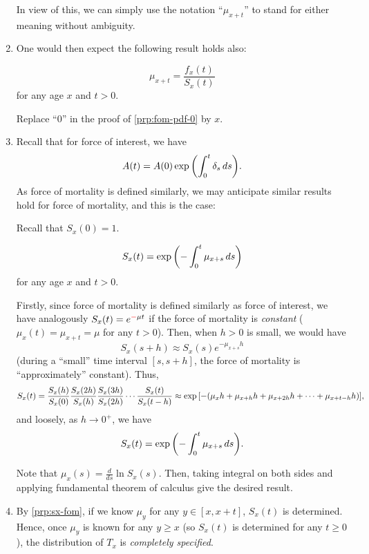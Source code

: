 \begin{enumerate}
In view of this, we can simply use the notation ``\(\mu_{x+t}\)'' to stand for
either meaning without ambiguity.

\item One would then expect the following result holds also:
\begin{proposition}
\[
\mu_{x+t}=\frac{f_x(t)}{S_x(t)}
\]
for any age \(x\) and \(t>0\).
\end{proposition}
\begin{pf}
Replace ``0'' in the proof of \cref{prp:fom-pdf-0} by \(x\).
\end{pf}

\item Recall that for force of interest, we have
\[
A(t)=A(0)\exp\qty(\int_{0}^{t}\delta_s\,ds).
\]
As force of mortality is defined similarly, we may anticipate similar results
hold for force of mortality, and this is the case:
\begin{note}
Recall that \(S_x(0)=1\).
\end{note}
\begin{proposition}
\label{prp:sx-fom}
\[
S_x(t)=\exp\qty(-\int_{0}^{t}\mu_{x+s}\,ds)
\]
for any age \(x\) and \(t>0\).
\end{proposition}

\begin{intuition}
Firstly, since force of mortality is defined similarly as force of interest, we
have analogously \(S_x(t)=e^{{\color{red}-}\mu t}\) if the force of mortality is
\emph{constant} (\(\mu_x(t)=\mu_{x+t}=\mu\) for any \(t>0\)). Then, when
\(h>0\) is small, we would have
\[
S_x(s+h)\approx S_x(s)e^{-\mu_{x+s} h}
\]
(during a ``small'' time interval \([s, s+h]\), the force of mortality is
``approximately'' constant). Thus,
\[
S_x(t)=\frac{S_x(h)}{S_x(0)}\frac{S_x(2h)}{S_x(h)}\frac{S_x(3h)}{S_x(2h)}\cdots\frac{S_x(t)}{S_x(t-h)}
\approx \exp\qty[-(\mu_{x}h+\mu_{x+h} h+\mu_{x+2h} h+\dotsb+\mu_{x+t-h}h)],
\]
and loosely, as \(h\to 0^+\), we have
\[
S_x(t)=\exp\qty(-\int_{0}^{t}\mu_{x+s}\,ds).
\]
\end{intuition}

\begin{pf}
Note that \(\displaystyle\mu_{x}(s)=\frac{d}{ds}\ln S_x(s)\). Then, taking
integral on both sides and applying fundamental theorem of calculus give the
desired result.
\end{pf}

\item \label{it:fom-spec-dist} By \cref{prp:sx-fom}, if we know \(\mu_y\) for
any \(y\in[x, x+t]\), \(S_x(t)\) is determined. Hence, once \(\mu_y\) is known
for any \(y\ge x\) (so \(S_x(t)\) is determined for any \(t\ge 0\)), the
distribution of \(T_x\) is \emph{completely specified}.


\end{enumerate}
